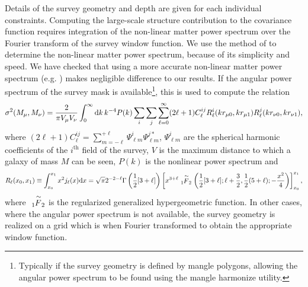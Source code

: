 Details of the survey geometry and depth are given for each individual constraints. Computing the large-scale structure contribution to the covariance function requires integration of the non-linear matter power spectrum over the Fourier transform of the survey window function. We use the method of \cite{peacock_non-linear_1996} to determine the non-linear matter power spectrum, because of its simplicity and speed. We have checked that using a more accurate non-linear matter power spectrum (e.g. \citealt{lawrence_coyote_2010}) makes negligible difference to our results. If the angular power spectrum of the survey mask is available\footnote{Typically if the survey geometry is defined by \protect\gls{mangle} polygons, allowing the angular power spectrum to be found using the \protect\gls{mangle} {\normalfont \ttfamily harmonize} utility.}, this is used to compute the relation
\begin{equation}
  \sigma^2(M_\mu,M_\nu) = {2 \over \pi V_\mu V_\nu}\int_0^\infty \mathrm{d} k\, k^{-4} P(k) \sum_i \sum_j \sum_{\ell=0}^\infty (2\ell+1) C^{ij}_\ell R^i_{\ell}(kr_{\mu 0},kr_{\mu 1}) R^j_{\ell}(kr_{\nu 0},kr_{\nu 1}),
\end{equation}
where $(2\ell+1) C^{ij}_\ell = \sum_{m=-\ell}^{+\ell} \Psi^i_{\ell m} \Psi^{j*}_{\ell m}$, $\Psi^i_{\ell m}$ are the spherical harmonic coefficients of the $i^\mathrm{th}$ field of the survey, $V$ is the maximum distance to which a galaxy of mass $M$ can be seen, $P(k)$ is the nonlinear power spectrum and
\begin{equation}
 R_{\ell}(x_0,x_1) \equiv \int_{x_0}^{x_1} x^2 j_\ell(x) \mathrm{d}x = \sqrt{\pi} 2^{-2-\ell} \Gamma\left({1\over 2}[3+\ell]\right) \left[ x^{3+\ell} \tensor*[_1]{\stackrel{\sim}{F}}{_2} \left({1\over 2}[3+\ell]; \ell+{3\over 2},{1\over 2}(5+\ell);-{x^2\over 4}\right)\right]_{x_0}^{x_1},
\end{equation}
where $\tensor*[_1]{\stackrel{\sim}{F}}{_2}$ is the regularized generalized hypergeometric function. In other cases, where the angular power spectrum is not available, the survey geometry is realized on a grid which is when Fourier transformed to obtain the appropriate window function.

